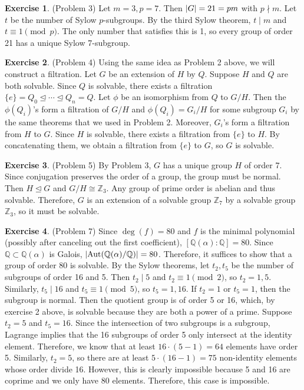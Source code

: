\documentclass[12pt, psamsfonts]{amsart}
\theoremstyle{definition}
\newtheorem*{exer}{Exercise}
\theoremstyle{remark}
\DeclareMathOperator{\Aut}{Aut}
\numberwithin{equation}{section}
\begin{document}
\begin{exer}{(Problem 3)}
  Let $m = 3, p = 7$.
  Then $\abs{G} = 21 = pm$ with $p \nmid m$.
  Let $t$ be the number of Sylow $p$-subgroups.
  By the third Sylow theorem, $t \mid m$ and $t \equiv 1 \pmod p$.
  The only number that satisfies this is 1, so every group of order 21 has a unique Sylow 7-subgroup.
\end{exer}

\begin{exer}{(Problem 4)}
  Using the same idea as Problem 2 above, we will construct a filtration.
  Let $G$ be an extension of $H$ by $Q$.
  Suppose $H$ and $Q$ are both solvable.
  Since $Q$ is solvable, there exists a filtration $\{ e \} = Q_0 \trianglelefteq \cdots \trianglelefteq Q_n = Q$.
  Let $\phi$ be an isomorphism from $Q$ to $G / H$.
  Then the $\phi(Q_i)$'s form a filtration of $G / H$ and $\phi(Q_i) = G_i / H$ for some subgroup $G_i$ by the same theorems that we used in Problem 2.
  Moreover, $G_i$'s form a filtration from $H$ to $G$.
  Since $H$ is solvable, there exists a filtration from $\{ e \}$ to $H$.
  By concatenating them, we obtain a filtration from $\{ e \}$ to $G$, so $G$ is solvable.
\end{exer}

\begin{exer}{(Problem 5)}
  By Problem 3, $G$ has a unique group $H$ of order 7.
  Since conjugation preserves the order of a group, the group must be normal.
  Then $H \trianglelefteq G$ and $G / H \cong \mathbb{Z}_3$.
  Any group of prime order is abelian and thus solvable.
  Therefore, $G$ is an extension of a solvable group $\mathbb{Z}_7$ by a solvable group $\mathbb{Z}_3$, so it must be solvable.
\end{exer}

\begin{exer}{(Problem 7)}
  Since $\deg(f) = 80$ and $f$ is the minimal polynomial (possibly after canceling out the first coefficient), $[\mathbb{Q}(\alpha):\mathbb{Q}] = 80$.
  Since $\mathbb{Q} \subset \mathbb{Q}(\alpha)$ is Galois, $\abs{\Aut(\mathbb{Q}(\alpha)/\mathbb{Q})} = 80$.
  Therefore, it suffices to show that a group of order 80 is solvable.
  By the Sylow theorems, let $t_2, t_5$ be the number of subgroups of order 16 and 5.
  Then $t_2 \mid 5$ and $t_2 \equiv 1 \pmod 2$, so $t_2 = 1, 5$.
  Similarly, $t_5 \mid 16$ and $t_5 \equiv 1 \pmod 5$, so $t_5 = 1, 16$.
  If $t_2 = 1$ or $t_5 = 1$, then the subgroup is normal.
  Then the quotient group is of order 5 or 16, which, by exercise 2 above, is solvable because they are both a power of a prime.
  Suppose $t_2 = 5$ and $t_5 = 16$.
  Since the intersection of two subgroups is a subgroup, Lagrange implies that the 16 subgroups of order 5 only intersect at the identity element.
  Therefore, we know that at least $16 \cdot (5 - 1) = 64$ elements have order 5.
  Similarly, $t_2 = 5$, so there are at least $5 \cdot (16 - 1) = 75$ non-identity elements whose order divide 16.
  However, this is clearly impossible because 5 and 16 are coprime and we only have 80 elements.
  Therefore, this case is impossible.
\end{exer}
\end{document}
